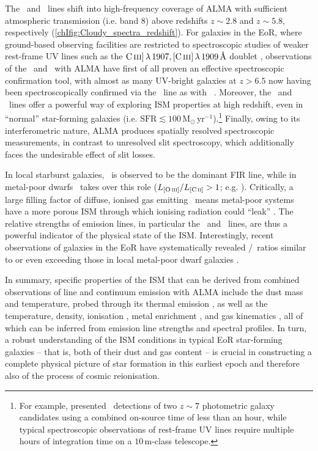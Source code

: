 The \CII\ and \OIIIf\ lines shift into high-frequency coverage of ALMA with sufficient atmospheric transmission (i.e. band 8) above redshifts $z \sim 2.8$ and $z \sim 5.8$, respectively (\cref{chIfig:Cloudy_spectra_redshift}). For galaxies in the EoR, where ground-based observing facilities are restricted to spectroscopic studies of weaker rest-frame UV lines such as the $\CIIIs \, \lambda \, 1907, \CIIIf \, \lambda \, 1909 \, \Angstrom$ doublet \citep[e.g.][]{2021ApJ...917L..36T}, observations of the \CII\ and \OIIIf\ with ALMA have first of all proven an effective spectroscopic confirmation tool, with almost as many UV-bright galaxies at $z > 6.5$ now having been spectroscopically confirmed via the \CII\ line as with  \lymana\ \citep[\lya;][]{2022ApJ...931..160B}. Moreover, the \OIIIf\ and \CII\ lines offer a powerful way of exploring ISM properties at high redshift, even in ``normal'' star-forming galaxies (i.e. $\text{SFR} \lesssim 100 \, \mathrm{M_\odot \, yr^{-1}}$).\footnote{For example, \citet{2018Natur.553..178S} presented \CII\ detections of two $z \sim 7$ photometric galaxy candidates using a combined on-source time of less than an hour, while typical spectroscopic observations of rest-frame UV lines require multiple hours of integration time on a $10 \, \mathrm{m}$-class telescope.} Finally, owing to its interferometric nature, ALMA produces spatially resolved spectroscopic measurements, in contrast to unresolved slit spectroscopy, which additionally faces the undesirable effect of slit losses.

In local starburst galaxies, \CII\ is observed to be the dominant FIR line, while in metal-poor dwarfs \OIIIf\ takes over this role ($L_\OIIIf/L_\CII > 1$; e.g. \citealt{2020ApJ...896...93H}). Critically, a large filling factor of diffuse, ionised gas emitting \OIIILam\ means metal-poor systems have a more porous ISM through which ionising radiation could ``leak'' \citep{2015A&A...578A..53C}. The relative strengths of emission lines, in particular the \OIIIf\ and \CII\ lines, are thus a powerful indicator of the physical state of the ISM. Interestingly, recent observations of galaxies in the EoR have systematically revealed \OIIIf/\CII\ ratios similar to or even exceeding those in local metal-poor dwarf galaxies \citep[e.g.][]{2020MNRAS.499.5136C}.

In summary, specific properties of the ISM that can be derived from combined observations of line and continuum emission with ALMA include the dust mass and temperature, probed through its thermal emission \citep[e.g.][]{2020MNRAS.493.4294B, 2021MNRAS.508L..58B, 2022ApJ...928...31S}, as well as the temperature, density, ionisation \citep[e.g.][]{2019MNRAS.489....1F, 2019MNRAS.487.1689P, 2021MNRAS.505.5543V}, metal enrichment \citep[e.g.][]{2015ApJ...813...36V}, and gas kinematics \citep[e.g.][]{2021MNRAS.507.3540J}, all of which can be inferred from emission line strengths and spectral profiles. In turn, a robust understanding of the ISM conditions in typical EoR star-forming galaxies -- that is, both of their dust and gas content -- is crucial in constructing a complete physical picture of star formation in this earliest epoch and therefore also of the process of cosmic reionisation.

